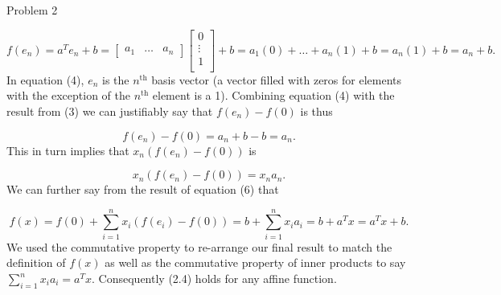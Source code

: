 \begin{problem}{Problem 2}
\begin{Highlight}[Solution]
        \begin{equation}
            f(e_{n}) = a^{T}e_{n} + b = 
            \begin{bmatrix}
                a_{1} & \dots & a_{n}
            \end{bmatrix}
            \begin{bmatrix}
                0 \\
                \vdots \\
                1 \\
            \end{bmatrix}
            + b = a_{1}(0) + \dots + a_{n}(1) + b = a_{n}(1) + b = a_{n} + b.
        \end{equation}
        In equation (4), $e_{n}$ is the $n^{\text{th}}$ basis vector (a vector filled with zeros for elements with the exception of the $n^{\text{th}}$ element is a 1). Combining equation (4) with the 
        result from (3) we can justifiably say that $f(e_{n}) - f(0)$ is thus

        \begin{equation}
            f(e_{n}) - f(0) = a_{n} + b - b = a_{n}.
        \end{equation}
        This in turn implies that $x_{n}(f(e_{n}) - f(0))$ is

        \begin{equation}
            x_{n}(f(e_{n}) - f(0)) = x_{n}a_{n}.
        \end{equation}
        We can further say from the result of equation (6) that

        \begin{equation}
            f(x) = f(0) + \sum^{n}_{i = 1} x_{i}(f(e_{i}) - f(0)) = b + \sum^{n}_{i = 1} x_{i}a_{i} = b + a^{T}x = a^{T}x + b.
        \end{equation}
        We used the commutative property to re-arrange our final result to match the definition of $f(x)$ as well as the commutative property of inner products to say $\sum^{n}_{i=1}x_{i}a_{i} = a^{T}x$.
        Consequently (2.4) holds for any affine function.
    \end{Highlight}
\end{problem}

